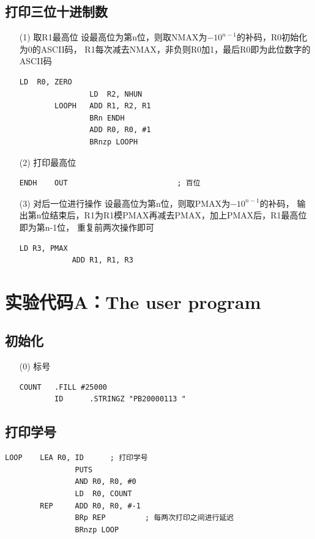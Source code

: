 \documentclass[UTF8]{ctexart}
\begin{document}
    \subsection{打印三位十进制数}
    \begin{enumerate}
        \item [(1)]取R1最高位
        设最高位为第n位，则取NMAX为$- {10}^{n-1}$的补码，R0初始化为0的ASCII码，
        R1每次减去NMAX，非负则R0加1，最后R0即为此位数字的ASCII码
        \begin{lstlisting}[basicstyle=\ttfamily,language={[x86masm]Assembler}]
                LD  R0, ZERO
                LD  R2, NHUN
        LOOPH   ADD R1, R2, R1
                BRn ENDH
                ADD R0, R0, #1
                BRnzp LOOPH
        \end{lstlisting}
        \item [(2)]打印最高位
        \begin{lstlisting}[basicstyle=\ttfamily,language={[x86masm]Assembler}]
            ENDH    OUT                         ; 百位
        \end{lstlisting}
        \item [(3)]对后一位进行操作
        设最高位为第n位，则取PMAX为$- {10}^{n-1}$的补码，
        输出第n位结束后，R1为R1模PMAX再减去PMAX，加上PMAX后，R1最高位即为第n-1位，
        重复前两次操作即可
        \begin{lstlisting}[basicstyle=\ttfamily,language={[x86masm]Assembler}]
            LD R3, PMAX
            ADD R1, R1, R3
        \end{lstlisting}
    \end{enumerate}

\section{实验代码A：The user program}
\subsection{初始化}
\begin{enumerate}
    \item [(0)]标号
    \begin{lstlisting}[basicstyle=\ttfamily,language={[x86masm]Assembler}]
        COUNT   .FILL #25000        
        ID      .STRINGZ "PB20000113 "        
    \end{lstlisting}
\end{enumerate}
\subsection{打印学号}
    \begin{lstlisting}[basicstyle=\ttfamily,language={[x86masm]Assembler}]
        LOOP    LEA R0, ID      ; 打印学号
                PUTS
                AND R0, R0, #0
                LD  R0, COUNT
        REP     ADD R0, R0, #-1
                BRp REP         ; 每两次打印之间进行延迟
                BRnzp LOOP
    \end{lstlisting}
\end{document}
